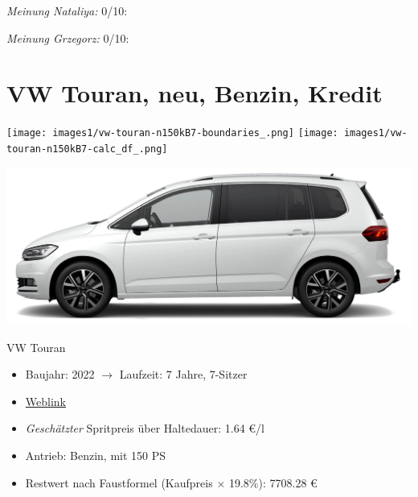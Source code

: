 \documentclass[landscape, DIV=99, 14pt]{scrartcl}
\begin{document}
\begin{small}
\emph{Meinung Nataliya:} 0/10: 
        
\emph{Meinung Grzegorz:} 0/10: 
\end{small}

\pagebreak


\twocolumn

\section*{VW Touran, neu, Benzin, Kredit}
\begin{center}
\texttt{[image: images1/vw-touran-n150kB7-boundaries\_.png]}
\null
\vspace{0.5cm}
\texttt{[image: images1/vw-touran-n150kB7-calc\_df\_.png]}
\end{center}

\pagebreak
\begin{center}
\includegraphics[width=0.9\columnwidth]{cars/vw-touran-neu-benzin.png}

VW Touran
\end{center}

\begin{itemize}
    \item Baujahr: 2022 $\rightarrow$ Laufzeit: 7 Jahre, 7-Sitzer
    \item \href{https://www.volkswagen.de/de/konfigurator.html/__app/touran/touran/highline.app?buildabilityStatus-app=buildable&category-app=private&carlineId-app=31000&salesGroupId-app=32600&trimName-app=Highline&modelId-app=5T14PZ%24GYORYOR&modelVersion-app=2&modelYear-app=2022&exteriorId-app=F14+0Q0Q&interiorId-app=F56+++++BG&options-app=GWBGWBG-GPG3PG3-MAHV1M6-GPF9PF9-GRBDRBD-MKSUKA1-MSSH4KF-GP19P19-MVTV9IJ-GWQ1WQ1}{Weblink}
    \item \emph{Gesch\"atzter} Spritpreis \"uber Haltedauer: 1.64 \euro{}/l
    \item Antrieb: Benzin, mit 150 PS
    \item Restwert nach Faustformel (Kaufpreis $\times$ 19.8\%): 7708.28 \euro{}
\end{itemize}
\end{document}
